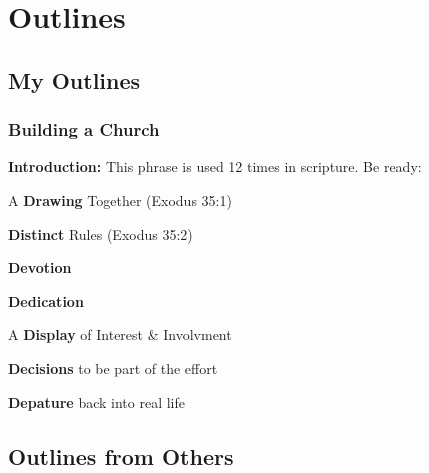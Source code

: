 \section{Outlines}

\subsection{My Outlines}

\subsubsection{Building a Church}
\textbf{Introduction: }This phrase is used 12 times in scripture. Be ready:
\begin{compactenum}[I.][10]
    \item A \textbf{Drawing} Together (Exodus 35:1)
    \item \textbf{Distinct} Rules (Exodus 35:2)
    \item \textbf{Devotion} %
    \item \textbf{Dedication} %
    \item A \textbf{Display} of Interest \& Involvment %
    \item \textbf{Decisions} to be part of the effort %
    \item \textbf{Depature} back into real life%
\end{compactenum}

\subsection{Outlines from Others}
